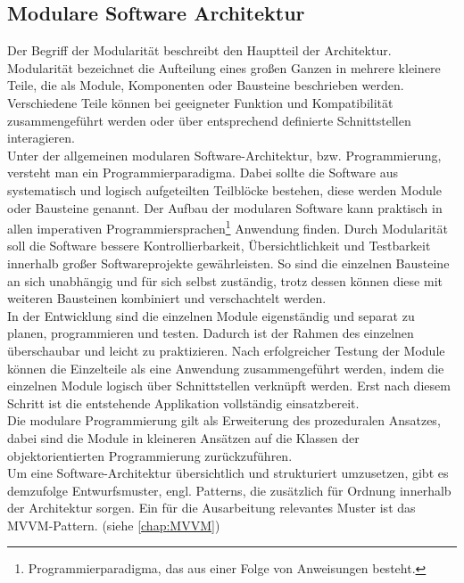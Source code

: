 \subsection{Modulare Software Architektur}
\label{chap:Modulare Software Architektur}
Der Begriff der Modularität beschreibt den Hauptteil der Architektur. Modularität bezeichnet die Aufteilung eines großen Ganzen in 
mehrere kleinere Teile, die als Module, Komponenten oder Bausteine beschrieben werden. Verschiedene Teile können bei geeigneter Funktion 
und Kompatibilität zusammengeführt werden oder über entsprechend definierte Schnittstellen interagieren. 
\\ 
Unter der allgemeinen modularen Software-Architektur, bzw. Programmierung, versteht man ein Programmierparadigma. Dabei sollte die Software aus 
systematisch und logisch aufgeteilten Teilblöcke bestehen, diese werden Module oder Bausteine genannt. Der Aufbau der modularen Software kann 
praktisch in allen imperativen Programmiersprachen\footnote{Programmierparadigma, das aus einer Folge von Anweisungen besteht.} 
Anwendung finden. Durch Modularität soll die Software bessere Kontrollierbarkeit, Übersichtlichkeit und Testbarkeit innerhalb großer 
Softwareprojekte gewährleisten. So sind die einzelnen Bausteine an sich unabhängig und für sich selbst zuständig, trotz dessen können 
diese mit weiteren Bausteinen kombiniert und verschachtelt werden. 
\\ 
In der Entwicklung sind die einzelnen Module eigenständig und separat zu planen, programmieren und testen. Dadurch ist der Rahmen des 
einzelnen überschaubar und leicht zu praktizieren. Nach erfolgreicher Testung der Module können die Einzelteile als eine Anwendung 
zusammengeführt werden, indem die einzelnen Module logisch über Schnittstellen verknüpft werden. Erst nach diesem Schritt ist die 
entstehende Applikation vollständig einsatzbereit.
\\ 
Die modulare Programmierung gilt als Erweiterung des prozeduralen Ansatzes, dabei sind die Module in kleineren Ansätzen auf die Klassen 
der objektorientierten Programmierung zurückzuführen. \cite{modularesoftware.2018s}
\\
Um eine Software-Architektur übersichtlich und strukturiert umzusetzen, gibt es demzufolge Entwurfsmuster, engl. Patterns, die zusätzlich für 
Ordnung innerhalb der Architektur sorgen. Ein für die Ausarbeitung relevantes Muster ist das MVVM-Pattern. (siehe \ref{chap:MVVM})

